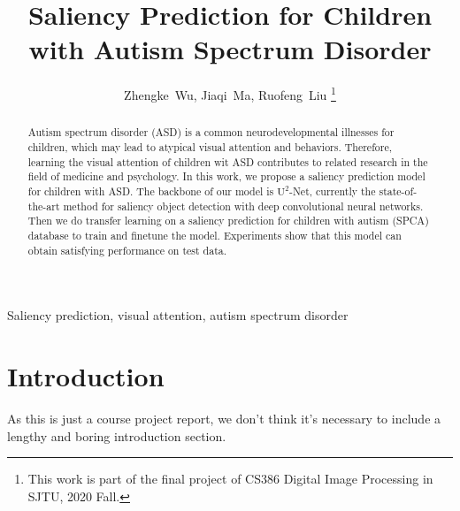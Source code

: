 \documentclass[journal]{IEEEtran}
\begin{document}
%
\title{Saliency Prediction for Children with Autism Spectrum Disorder}


\author{Zhengke~Wu, Jiaqi~Ma, Ruofeng~Liu
\thanks{This work is part of the final project of CS386 Digital Image Processing in SJTU, 2020 Fall.}}

\maketitle

\begin{abstract}
Autism spectrum disorder (ASD) is a common neurodevelopmental illnesses for children, which may lead to atypical visual attention and behaviors. Therefore, learning the visual attention of children wit ASD contributes to related research in the field of medicine and psychology. In this work, we propose a saliency prediction model for children with ASD. The backbone of our model is $\text{U}^2$-Net, currently the state-of-the-art method for saliency object detection with deep convolutional neural networks. Then we do transfer learning on a saliency prediction for children with autism (SPCA) database to train and finetune the model. Experiments show that this model can obtain satisfying performance on test data.
\end{abstract}

\begin{IEEEkeywords}
Saliency prediction, visual attention, autism spectrum disorder
\end{IEEEkeywords}

\IEEEpeerreviewmaketitle

\section{Introduction}

As this is just a course project report, we don't think it's necessary to include a lengthy and boring introduction section. 
\end{document}
